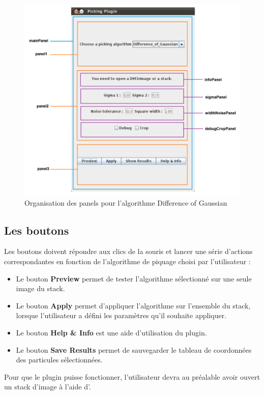 \documentclass[12pt,a4paper]{report}
\begin{document}
\begin{figure}[!h] 
\includegraphics[width=1\textwidth]{plugin3-1.png}
\caption{Organisation des panels pour l'algorithme Difference of Gaussian}
\label{panels}
\end{figure}

\subsection{Les boutons}

Les boutons doivent répondre aux clics de la souris et lancer une série d'actions correspondantes en fonction de l'algorithme de piquage choisi par l'utilisateur :

\begin{itemize}
\item Le bouton \textbf{Preview} permet de tester l'algorithme sélectionné sur une seule image du stack.
\item Le bouton \textbf{Apply} permet d'appliquer l'algorithme sur l'ensemble du stack, lorsque l'utilisateur a défini les paramètres qu'il souhaite appliquer.
\item Le bouton \textbf{Help \& Info} est une aide d'utilisation du plugin.
\item Le bouton \textbf{Save Results} permet de sauvegarder le tableau de coordonnées des particules sélectionnées.%
\end{itemize}
Pour que le plugin puisse fonctionner, l'utilisateur devra au préalable avoir ouvert un stack d'image à l'aide d'\imj.
\end{document}
